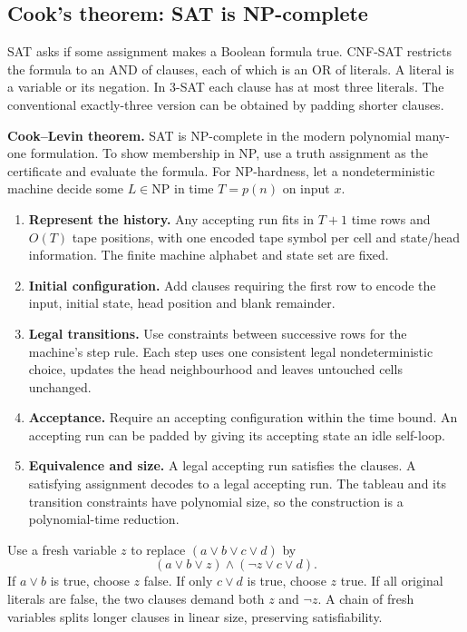 \documentclass[12pt,a4paper]{article}
\begin{document}
\subsection{Cook's theorem: SAT is NP-complete}
\begin{tcolorbox}[defbox, title={SAT, CNF-SAT and 3-SAT}]
SAT asks if some assignment makes a Boolean formula true. CNF-SAT restricts the formula to an AND of clauses, each of which is an OR of literals. A literal is a variable or its negation. In 3-SAT each clause has at most three literals. The conventional exactly-three version can be obtained by padding shorter clauses.
\end{tcolorbox}

\textbf{Cook--Levin theorem.} SAT is NP-complete in the modern polynomial many-one formulation. To show membership in NP, use a truth assignment as the certificate and evaluate the formula. For NP-hardness, let a nondeterministic machine decide some $L\in\mathrm{NP}$ in time $T=p(n)$ on input $x$.
\begin{enumerate}[leftmargin=*, itemsep=3pt, topsep=4pt]
  \item \textbf{Represent the history.} Any accepting run fits in $T+1$ time rows and $O(T)$ tape positions, with one encoded tape symbol per cell and state/head information. The finite machine alphabet and state set are fixed.
  \item \textbf{Initial configuration.} Add clauses requiring the first row to encode the input, initial state, head position and blank remainder.
  \item \textbf{Legal transitions.} Use constraints between successive rows for the machine's step rule. Each step uses one consistent legal nondeterministic choice, updates the head neighbourhood and leaves untouched cells unchanged.
  \item \textbf{Acceptance.} Require an accepting configuration within the time bound. An accepting run can be padded by giving its accepting state an idle self-loop.
  \item \textbf{Equivalence and size.} A legal accepting run satisfies the clauses. A satisfying assignment decodes to a legal accepting run. The tableau and its transition constraints have polynomial size, so the construction is a polynomial-time reduction.
\end{enumerate}
\begin{tcolorbox}[examplebox, title={Splitting a long CNF clause}]
Use a fresh variable $z$ to replace $(a\lor b\lor c\lor d)$ by
\[
(a\lor b\lor z)\land(\neg z\lor c\lor d).
\]
If $a\lor b$ is true, choose $z$ false. If only $c\lor d$ is true, choose $z$ true. If all original literals are false, the two clauses demand both $z$ and $\neg z$. A chain of fresh variables splits longer clauses in linear size, preserving satisfiability.
\end{tcolorbox}
\end{document}
